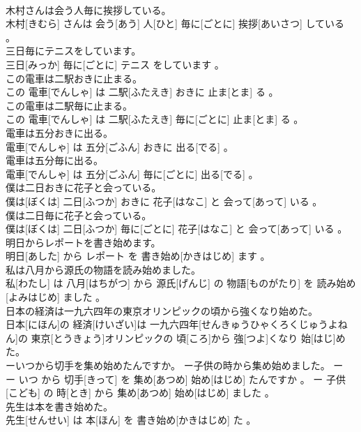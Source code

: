 \documentclass[8pt]{extreport}
\begin{document}
\begin{CJK}{UTF8}{min}
\\	木村さんは会う人毎に挨拶している。	
\\	木村[きむら] さんは 会う[あう] 人[ひと] 毎に[ごとに] 挨拶[あいさつ] している 。
\\	三日毎にテニスをしています。	
\\	三日[みっか] 毎に[ごとに] テニス をしています 。
\\	この電車は二駅おきに止まる。	
\\	この 電車[でんしゃ] は 二駅[ふたえき] おきに 止ま[とま] る 。
\\	この電車は二駅毎に止まる。	
\\	この 電車[でんしゃ] は 二駅[ふたえき] 毎に[ごとに] 止ま[とま] る 。
\\	電車は五分おきに出る。	
\\	電車[でんしゃ] は 五分[ごふん] おきに 出る[でる] 。
\\	電車は五分毎に出る。	
\\	電車[でんしゃ] は 五分[ごふん] 毎に[ごとに] 出る[でる] 。
\\	僕は二日おきに花子と会っている。	
\\	僕は[ぼくは] 二日[ふつか] おきに 花子[はなこ] と 会って[あって] いる 。
\\	僕は二日毎に花子と会っている。	
\\	僕は[ぼくは] 二日[ふつか] 毎に[ごとに] 花子[はなこ] と 会って[あって] いる 。
\\	明日からレポートを書き始めます。	
\\	明日[あした] から レポート を 書き始め[かきはじめ] ます 。
\\	私は八月から源氏の物語を読み始めました。	
\\	私[わたし] は 八月[はちがつ] から 源氏[げんじ] の 物語[ものがたり] を 読み始め[よみはじめ] ました 。
\\	日本の経済は一九六四年の東京オリンピックの頃から強くなり始めた。	
\\	日本[にほん]の 経済[けいざい]は 一九六四年[せんきゅうひゃくろくじゅうよねん]の 東京[とうきょう]オリンピックの 頃[ころ]から 強[つよ]くなり 始[はじ]めた。
\\	ーいつから切手を集め始めたんですか。 ー子供の時から集め始めました。	ー
\\	ー いつ から 切手[きって] を 集め[あつめ] 始め[はじめ] たんですか 。 ー 子供[こども] の 時[とき] から 集め[あつめ] 始め[はじめ] ました 。
\\	先生は本を書き始めた。	
\\	先生[せんせい] は 本[ほん] を 書き始め[かきはじめ] た 。

\end{CJK}
\end{document}
